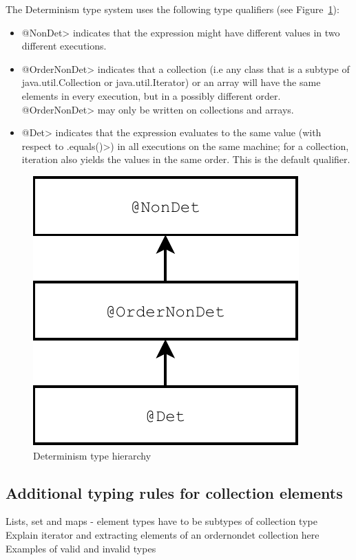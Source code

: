 The Determinism type system uses the following type qualifiers (see Figure~\ref{fig-determinism-hierarchy}):
\begin{itemize}
	\item \<@NonDet> indicates
	that the expression might have different values in two different executions.
	\item \<@OrderNonDet> indicates that
	a collection (i.e any class that is a subtype of java.util.Collection or java.util.Iterator) or an array will have the same elements in every execution, but in a
	possibly different order.  \<@OrderNonDet> may only be written on
	collections and arrays.
	\item \<@Det> indicates that
	the expression evaluates to the same value (with respect to \<.equals()>) in all
	executions on the same machine; for a collection, iteration also yields the values in the same
	order.
	This is the default qualifier.
\end{itemize}

\begin{figure}
	\begin{center}
		\includegraphics[scale=0.5]{determinism}
	\end{center}
	\caption{Determinism type hierarchy}
	\label{fig-determinism-hierarchy}
\end{figure}

\subsection{Additional typing rules for collection elements}
Lists, set and maps - element types have to be subtypes of collection type 
Explain iterator and extracting elements of an ordernondet collection here
Examples of valid and invalid types

